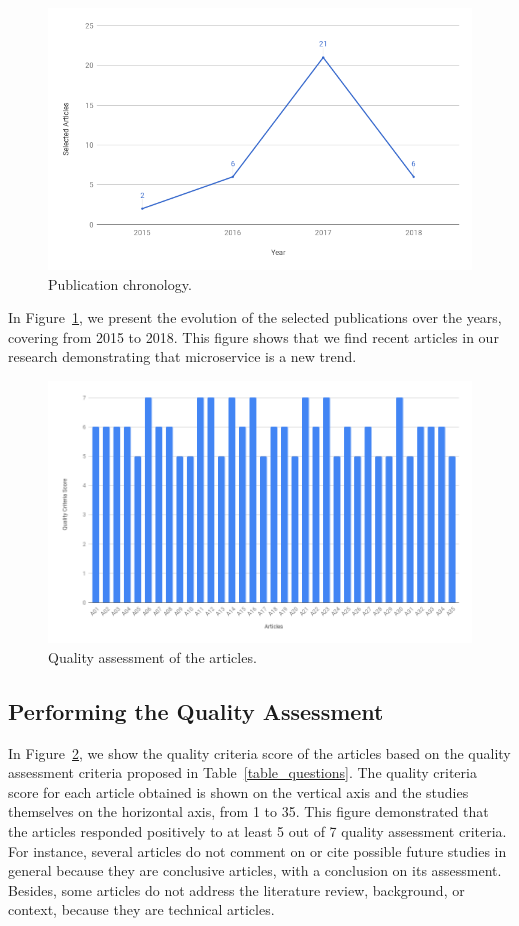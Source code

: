 \begin{figure}[h!bt]
\centering
\includegraphics[scale=0.5]{Images/publication_chronology.png}
\caption{Publication chronology.}
\label{chronology}
\end{figure}

In Figure~\ref{chronology}, we present the evolution of the selected publications over the years, covering from 2015 to 2018. This figure shows that we find recent articles in our research demonstrating that microservice is a new trend.

\begin{figure}[htb]
\centering
\includegraphics[scale=0.40]{Images/Quality_chart.png}
\caption{Quality assessment of the articles.}
\label{quality_chart}
\end{figure}

\subsection{Performing the Quality Assessment}
In Figure~\ref{quality_chart}, we show the quality criteria score of the articles based on the quality assessment criteria proposed in Table~\ref{table_questions}. The quality criteria score for each article obtained is shown on the vertical axis and the studies themselves on the horizontal axis, from 1 to 35. This figure demonstrated that the articles responded positively to at least 5 out of 7 quality assessment criteria. For instance, several articles do not comment on or cite possible future studies in general because they are conclusive articles, with a conclusion on its assessment. Besides, some articles do not address the literature review, background, or context, because they are technical articles.

